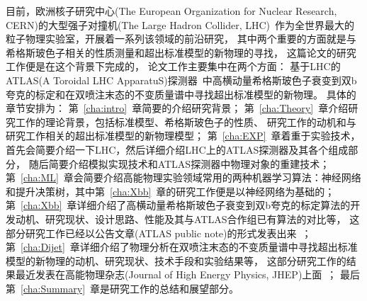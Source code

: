 目前，欧洲核子研究中心(The European Organization for Nuclear Research, CERN)的大型强子对撞机(The Large Hadron Collider, LHC)~\cite{Evans:2008zzb}作为全世界最大的粒子物理实验室，开展着一系列该领域的前沿研究，
其中两个重要的方面就是与希格斯玻色子相关的性质测量和超出标准模型的新物理的寻找，
这篇论文的研究工作便是在这个背景下完成的，
论文工作主要集中在两个方面：
基于LHC的ATLAS(A Toroidal LHC ApparatuS)探测器~\cite{PERF-2007-01}中高横动量希格斯玻色子衰变到双b夸克的标定和在双喷注末态的不变质量谱中寻找超出标准模型的新物理。
具体的章节安排为：
第~\ref{cha:intro}~章简要的介绍研究背景；
第~\ref{cha:Theory}~章介绍研究工作的理论背景，包括标准模型、希格斯玻色子的性质、
研究工作的动机和与研究工作相关的超出标准模型的新物理模型；
第~\ref{cha:EXP}~章着重于实验技术，首先会简要介绍一下LHC，然后详细介绍LHC上的ATLAS探测器及其各个组成部分，
随后简要介绍模拟实现技术和ATLAS探测器中物理对象的重建技术；
第~\ref{cha:ML}~章会简要介绍高能物理实验领域常用的两种机器学习算法：神经网络和提升决策树，其中第~\ref{cha:Xbb}~章的研究工作便是以神经网络为基础的；
第~\ref{cha:Xbb}~章详细介绍了高横动量希格斯玻色子衰变到双b夸克的标定算法的开发动机、研究现状、设计思路、性能及其与ATLAS合作组已有算法的对比等，%
这部分研究工作已经以公告文章(ATLAS public note)的形式发表出来~\cite{ATL-PHYS-PUB-2020-019}；
第~\ref{cha:Dijet}~章详细介绍了物理分析在双喷注末态的不变质量谱中寻找超出标准模型的新物理的动机、研究现状、技术手段和实验结果等，
这部分研究工作的结果最近发表在高能物理杂志(Journal of High Energy Physics, JHEP)上面~\cite{DijetPaper}；%
最后第~\ref{cha:Summary}~章是研究工作的总结和展望部分。












